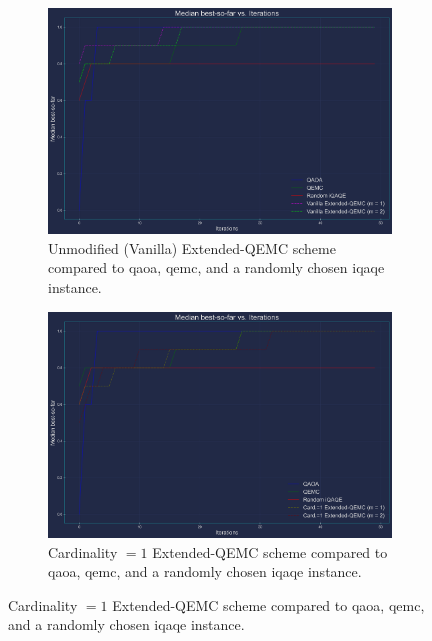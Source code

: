 \begin{figure}[ht!]
    \addtocounter{figure}{-1} %
    \centering
    \begin{subfigure}[t]{0.495\textwidth}
        \addtocounter{subfigure}{2} %
        \centering
        \includegraphics[width=1\textwidth]{Figures/Appendix_A/8-node/Basic+V_Extended_QEMC(8-node).png}
        \caption{Unmodified (Vanilla) Extended-QEMC scheme compared to \acrshort{qaoa}, \acrshort{qemc}, and a randomly chosen \acrshort{iqaqe} instance.}
        \label{fig:C_BSF_3_8-node}
    \end{subfigure}
    \hfill
    \begin{subfigure}[t]{0.495\textwidth}
        \centering
        \includegraphics[width=1\textwidth]{Figures/Appendix_A/8-node/Basic+C1_Extended_QEMC(8-node).png}
        \caption{Cardinality $= 1$ Extended-QEMC scheme compared to \acrshort{qaoa}, \acrshort{qemc}, and a randomly chosen \acrshort{iqaqe} instance.}
        \label{fig:C_BSF_4_8-node}
    \end{subfigure}
\end{figure}

